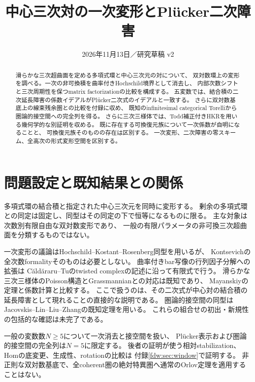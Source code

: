 
\title{中心三次対の一次変形とPl\"ucker二次障害}
\author{}
\date{2026年11月13日／研究草稿 v2}

\maketitle
\begin{abstract}
滑らかな三次超曲面を定める多項式環と中心三次元の対について、
双対数環上の変形を調べる。一次の非可換積を曲率付きHochschild境界として消去し、
内部次数シフトと三次周期性を保つmatrix factorizationの比較を構成する。
五変数では、結合積の二次延長障害の係数イデアルがPl\"ucker二次式のイデアルと一致する。
さらに双対数基底上の線束残余圏との比較を付録に収め、
既知のinfinitesimal categorical Torelliから圏論的接空間への完全列を得る。
さらに三次三様体では、Todd補正付きHKRを用いる幾何学的な別証明を収める。
既に存在する可換復元族について一次係数が自明になることと、
可換復元族そのものの存在は区別する。
一次変形、二次障害の零スキーム、全高次の形式変形空間を区別する。
\end{abstract}

\section*{問題設定と既知結果との関係}
多項式環の結合積と指定された中心三次元を同時に変形する。
剰余の多項式環との同定は固定し、同型はその同定の下で恒等になるものに限る。
主な対象は次数別有限自由な双対数変形であり、
一般の有限パラメータの非可換三次超曲面を分類するものではない。

一次変形の議論はHochschild--Kostant--Rosenberg同型を用いるが、
Kontsevichの全次数formalityそのものは必要としない\cite{Kontsevich}。
曲率付きbar写像の行列因子分解への拡張は
C\u{a}ld\u{a}raru--Tuのtwisted complexの記述\cite{CT}に沿って有限式で行う。
滑らかな三次三様体のPoisson構造とGrassmannianとの対応は既知であり、
Mayanskiyの定理と係数計算\cite[Theorem~1, Section~2]{PMayanskiy}と比較する。
ここで扱うのは、その二次式が中心対の結合積の延長障害として現れることの直接的な説明である。
圏論的接空間の同型はJacovskis--Lin--Liu--Zhangの既知定理\cite[Theorem~4.4(2)]{JLLZ}を用いる。
これらの組合せの初出・新規性の包括的な確認は未完了である。

一般の変数数$N\ge5$について一次消去と接空間を扱い、
Pl\"ucker表示および圏論的接空間の完全列は$N=5$に限定する。
後者の証明が使う相対stabilization、Homの底変更、生成性、rotationの比較は
付録\ref{fdw:sec:window}で証明する。
非正則な双対数基底で、全coherent圏の絶対特異圏へ通常のOrlov定理を適用することはない。

